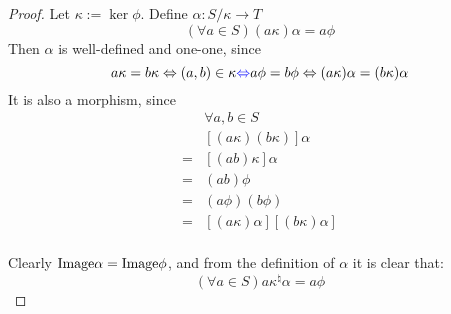 \begin{Them}
\begin{proof}
        Let $\kappa:= \ker \phi$. Define $\alpha:S/\kappa \rightarrow T$
        \[
            (\forall a \in S)(a\kappa)\alpha = a\phi
        \]
        Then $\alpha$ is well-defined and one-one, since
        \[
            a\kappa =b\kappa \Leftrightarrow (a,b)\in \kappa \textcolor{blue}{\Leftrightarrow} a\phi = b\phi \Leftrightarrow (a\kappa)\alpha = (b\kappa)\alpha
        \]
        It is also a morphism, since
        \begin{align*}
            & \forall a,b \in S \\
            & [(a\kappa)(b\kappa)]\alpha    \\
            =& [(ab)\kappa]\alpha   \\
            =& (ab)\phi \\
            =& (a\phi)(b\phi)   \\
            =& [(a\kappa)\alpha][(b\kappa)\alpha]   \\
        \end{align*}

        Clearly $\mathrm{Image} \alpha = \mathrm{Image} \phi$, and from the definition of $\alpha$ it is clear that:
        \[
            (\forall a \in S) a\kappa^{\natural}\alpha = a\phi
        \]
    \end{proof}
\end{Them}

